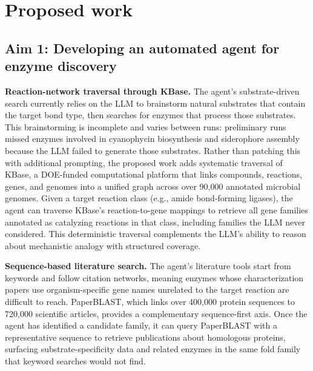\documentclass[12pt]{article}
\begin{document}
\section{Proposed work}
\label{sec:ProposedWork}

\subsection{Aim 1: Developing an automated agent for enzyme discovery}

\textbf{Reaction-network traversal through KBase.} The agent's substrate-driven search currently relies on the LLM to brainstorm natural substrates that contain the target bond type, then searches for enzymes that process those substrates. This brainstorming is incomplete and varies between runs: preliminary runs missed enzymes involved in cyanophycin biosynthesis and siderophore assembly because the LLM failed to generate those substrates. Rather than patching this with additional prompting, the proposed work adds systematic traversal of KBase\cite{arkin2018kbase}, a DOE-funded computational platform that links compounds, reactions, genes, and genomes into a unified graph across over 90,000 annotated microbial genomes\cite{overbeek2014seed}. Given a target reaction class (e.g., amide bond-forming ligases), the agent can traverse KBase's reaction-to-gene mappings to retrieve all gene families annotated as catalyzing reactions in that class, including families the LLM never considered. This deterministic traversal complements the LLM's ability to reason about mechanistic analogy with structured coverage.

\textbf{Sequence-based literature search.} The agent's literature tools start from keywords and follow citation networks, meaning enzymes whose characterization papers use organism-specific gene names unrelated to the target reaction are difficult to reach. PaperBLAST\cite{price2017paperblast}, which links over 400,000 protein sequences to 720,000 scientific articles, provides a complementary sequence-first axis. Once the agent has identified a candidate family, it can query PaperBLAST with a representative sequence to retrieve publications about homologous proteins, surfacing substrate-specificity data and related enzymes in the same fold family that keyword searches would not find.
\end{document}
